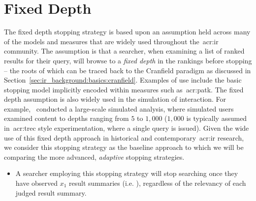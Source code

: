 \section{Fixed Depth}\label{chap:strategies:fixed}
The fixed depth stopping strategy is based upon an assumption held across many of the models and measures that are widely used throughout the~\gls{acr:ir} community. The assumption is that a searcher, when examining a list of ranked results for their query, will browse to a \emph{fixed depth} in the rankings before stopping -- the roots of which can be traced back to the Cranfield paradigm as discussed in Section~\ref{sec:ir_background:basics:cranfield}. Examples of use include the basic stopping model implicitly encoded within measures such as~\gls{acr:patk}. The fixed depth assumption is also widely used in the simulation of interaction. For example,~\cite{azzopardi2011economics} conducted a large-scale simulated analysis, where simulated users examined content to depths ranging from $5$ to $1,000$ ($1,000$ is typically assumed in~\gls{acr:trec} style experimentation, where a single query is issued). Given the wide use of this fixed depth approach in historical and contemporary~\gls{acr:ir} research, we consider this stopping strategy as the baseline approach to which we will be comparing the more advanced, \emph{adaptive} stopping strategies.

\begin{itemize}
    
    \item{} A searcher employing this stopping strategy will stop searching once they have observed $x_1$ result summaries (i.e. ), regardless of the relevancy of each judged result summary.
    
\end{itemize}

